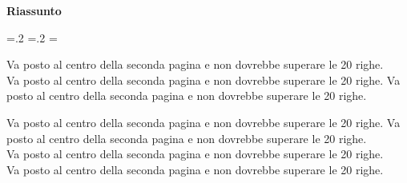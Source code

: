 	
	\vspace*{\fill}
	\begin{center}
		\textbf{\LARGE Riassunto}\newline\newline
	\end{center}
	\begin{list}{}{
			\leftmargin=.2\textwidth
			\rightmargin=.2\textwidth
			\listparindent=\parindent
			\itemsep=0pt
			\parsep=0pt}
		\item\relax
			Va posto al centro della seconda pagina e non dovrebbe superare le 20 righe.\\
			Va posto al centro della seconda pagina e non dovrebbe superare le 20 righe.
			Va posto al centro della seconda pagina e non dovrebbe superare le 20 righe.\\
			\par Va posto al centro della seconda pagina e non dovrebbe superare le 20 righe.
			Va posto al centro della seconda pagina e non dovrebbe superare le 20 righe.\\
			Va posto al centro della seconda pagina e non dovrebbe superare le 20 righe.\\
			Va posto al centro della seconda pagina e non dovrebbe superare le 20 righe.
		
	\end{list}
	\vfill %
	\clearpage



\clearpage